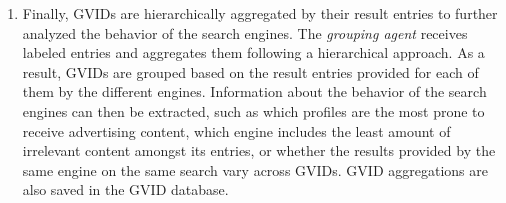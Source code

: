 \begin{enumerate}[label=\Roman*.]
    \item Finally, GVIDs are hierarchically aggregated by their result entries to further analyzed the behavior of the search engines. The \textit{grouping agent} receives labeled entries and aggregates them following a hierarchical approach. As a result, GVIDs are grouped based on the result entries provided for each of them by the different engines. Information about the behavior of the search engines can then be extracted, such as which profiles are the most prone to receive advertising content, which engine includes the least amount of irrelevant content amongst its entries, or whether the results provided by the same engine on the same search vary across GVIDs. GVID aggregations are also saved in the GVID database.
\end{enumerate}

